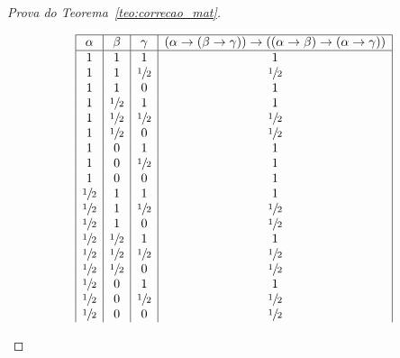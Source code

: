 \begin{proof}[Prova do Teorema~\ref{teo:correcao_mat}]
\begin{provaporcasos}
\begin{provaporsubcasos}
                    \begin{center}
                        \[
                            \begin{array}{|c|c|c|c|}%
                                \hline%
                                \alpha      & \beta & \gamma & (\alpha \to (\beta \to \gamma)) \to ((\alpha \to \beta) \to (\alpha \to \gamma)) \\
                                \hline%
                                1           & 1           & 1           & 1 \\
                                1           & 1           & \meio{} & \meio{} \\
                                1           & 1           & 0           & 1 \\
                                1           & \meio{} & 1           & 1 \\
                                1           & \meio{} & \meio{} & \meio{} \\
                                1           & \meio{} & 0           & \meio{} \\
                                1           & 0           & 1           & 1 \\
                                1           & 0           & \meio{} & 1 \\
                                1           & 0           & 0           & 1 \\
                                \meio{} & 1           & 1           & 1 \\
                                \meio{} & 1           & \meio{} & \meio{} \\
                                \meio{} & 1           & 0           & \meio{} \\
                                \meio{} & \meio{} & 1           & 1 \\
                                \meio{} & \meio{} & \meio{} & \meio{} \\
                                \meio{} & \meio{} & 0           & \meio{} \\
                                \meio{} & 0           & 1           & 1 \\
                                \meio{} & 0           & \meio{} & \meio{} \\
                                \meio{} & 0           & 0           & \meio{} \\

\end{array}\]
\end{center}
\end{provaporsubcasos}
\end{provaporcasos}
\end{proof}
